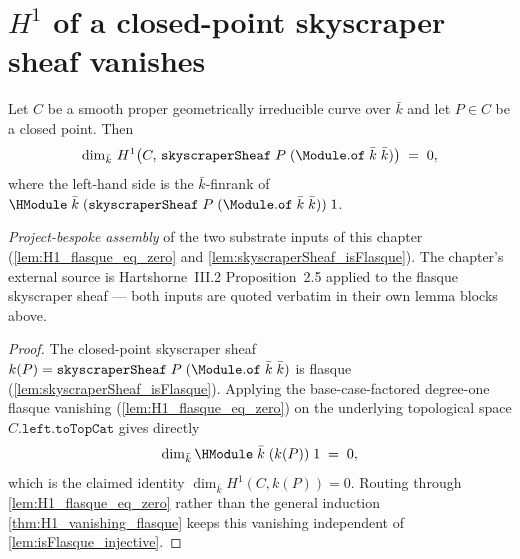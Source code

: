 \section{\(H^1\) of a closed-point skyscraper sheaf vanishes}
\label{sec:H1Vanishing_skyscraperH1}

\begin{theorem}

  \label{lem:H1_skyscraperSheaf_finrank_eq_zero_main}

  Let \(C\) be a smooth proper geometrically irreducible curve over
  \(\bar k\) and let \(P \in C\) be a closed point. Then
  \[
    \dim_{\bar k}\, H^1\bigl(C,\, \mathtt{skyscraperSheaf}\;P\;
      (\Module.\mathtt{of}\;\bar k\;\bar k)\bigr) \;=\; 0,
  \]
  where the left-hand side is the \(\bar k\)-finrank of
  \(\HModule\;\bar k\;(\mathtt{skyscraperSheaf}\;P\;(\Module.\mathtt{of}\;
  \bar k\;\bar k))\;1\).

  \textit{Project-bespoke assembly} of the two substrate inputs of this
  chapter (\cref{lem:H1_flasque_eq_zero} and
  \cref{lem:skyscraperSheaf_isFlasque}). The chapter's external source
  is Hartshorne~III.2 Proposition~2.5 applied to the flasque skyscraper
  sheaf — both inputs are quoted verbatim in their own lemma blocks
  above.
\end{theorem}

\begin{proof}
  \leanok
  The closed-point skyscraper sheaf
  \(k(P) = \mathtt{skyscraperSheaf}\;P\;(\Module.\mathtt{of}\;\bar k\;
  \bar k)\) is flasque (\cref{lem:skyscraperSheaf_isFlasque}). Applying
  the base-case-factored degree-one flasque vanishing
  (\cref{lem:H1_flasque_eq_zero}) on the underlying topological space
  \(C.\mathtt{left.toTopCat}\) gives directly
  \[
    \dim_{\bar k} \HModule\;\bar k\;(k(P))\;1 \;=\; 0,
  \]
  which is the claimed identity \(\dim_{\bar k} H^1(C, k(P)) = 0\).
  Routing through \cref{lem:H1_flasque_eq_zero} rather than the general
  induction \cref{thm:H1_vanishing_flasque} keeps this vanishing
  independent of \cref{lem:isFlasque_injective}.
\end{proof}

